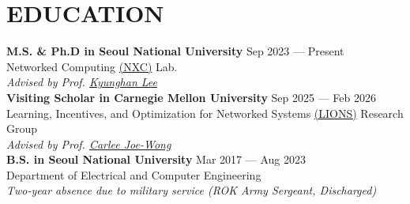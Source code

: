 \section*{EDUCATION}

\noindent
\textbf{M.S. \& Ph.D in Seoul National University} \hfill Sep 2023 --- Present \\
Networked Computing \href{https://nxc.snu.ac.kr}{(NXC)} Lab. \\
\textit{Advised by Prof. \href{https://scholar.google.com/citations?user=IwQCRuQAAAAJ&hl=en}{Kyunghan Lee}} \\

\noindent
\textbf{Visiting Scholar in Carnegie Mellon University} \hfill Sep 2025 --- Feb 2026 \\
Learning, Incentives, and Optimization
for Networked Systems \href{https://research.ece.cmu.edu/lions/}{(LIONS)} Research Group \\
\textit{Advised by Prof. \href{https://www.andrew.cmu.edu/user/cjoewong/}{Carlee Joe-Wong}} \\

\noindent
\textbf{B.S. in Seoul National University} \hfill Mar 2017 --- Aug 2023 \\
Department of Electrical and Computer Engineering \\
\textit{Two-year absence due to military service (ROK Army Sergeant, Discharged)} \\
